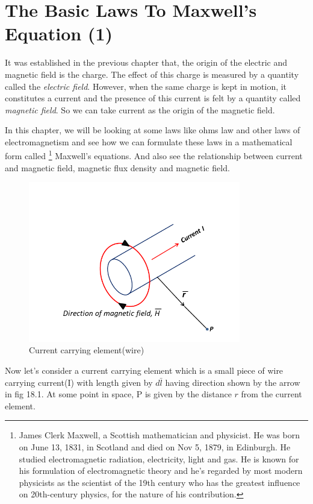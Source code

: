 \chapter{The Basic Laws To Maxwell's Equation (1)}\label{lec:lec18}
It was established in the previous chapter that, the origin of the electric and magnetic field is the charge. The effect of this charge is measured by a quantity called the \emph{electric field}. However, when the same charge is kept in motion, it constitutes a current and the presence of this current is felt by a quantity called \emph{magnetic field}. So we can take current as the origin of the magnetic field. 

In this chapter, we will be looking at some laws like ohms law and other laws of electromagnetism and see how we can formulate these laws in a mathematical form called \footnote{
James Clerk Maxwell, a Scottish mathematician and physicist. He was born on June 13, 1831, in Scotland and died on Nov 5, 1879, in Edinburgh. He studied electromagnetic radiation, electricity, light and gas. He is known for his formulation of electromagnetic theory and he's regarded by most modern physicists as the scientist of the 19th century who has the greatest influence on 20th-century physics, for the nature of his contribution.
} Maxwell's equations. And also see the relationship between current and magnetic field, magnetic flux density and magnetic field.
\begin{figure}[h]
\centering
\includegraphics[height=7cm]{./graphics/currentElement}
\caption{Current carrying element(wire)}
\label{fig:currentelement}
\end{figure}

Now let's consider a current carrying element which is a small piece of wire carrying current(I) with length given by $d\bar{l}$ having direction shown by the arrow in fig 18.1. At some point in space, P is given by the distance $r$ from the current element.

